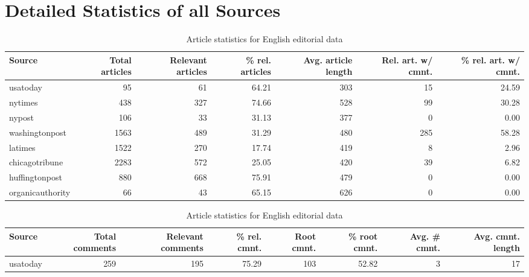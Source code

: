 \section{Detailed Statistics of all Sources}
\begin{table}
	\begin{tabular}{lrrrrrr}
		\toprule
		Source           & Total articles & Relevant articles & \% rel. articles & Avg. article length\footnotemark[1] & Rel. art. w/ cmnt. & \% rel. art. w/ cmnt. \\ \midrule
		usatoday         &             95 &                61 &            64.21 &                 303 &                 15 &                 24.59 \\
		nytimes          &            438 &               327 &            74.66 &                 528 &                 99 &                 30.28 \\
		nypost           &            106 &                33 &            31.13 &                 377 &                  0 &                  0.00 \\
		washingtonpost   &           1563 &               489 &            31.29 &                 480 &                285 &                 58.28 \\
		latimes          &           1522 &               270 &            17.74 &                 419 &                  8 &                  2.96 \\
		chicagotribune   &           2283 &               572 &            25.05 &                 420 &                 39 &                  6.82 \\
		huffingtonpost   &            880 &               668 &            75.91 &                 479 &                  0 &                  0.00 \\
		organicauthority &             66 &                43 &            65.15 &                 626 &                  0 &                  0.00 \\ \bottomrule
	\end{tabular}
	\caption{Article statistics for English editorial data} 
	\begin{tabular}{lrrrrrrr}
		\toprule
		Source           & Total comments & Relevant comments & \% rel. cmnt. & Root cmnt. & \% root cmnt. & Avg. \# cmnt. & Avg. cmnt. length\footnotemark[1] \\ \midrule
		usatoday         &            259 &               195 &         75.29 &        103 &         52.82 &             3 &                17 \\

\end{tabular}
\end{table}
